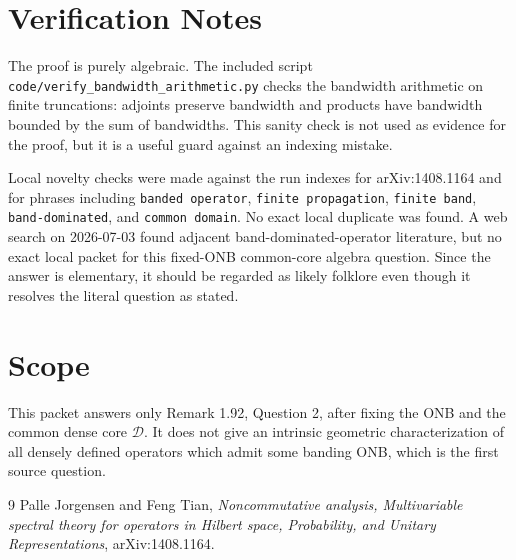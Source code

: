 \documentclass[11pt]{article}
\newcommand{\cD}{\mathcal D}
\begin{document}
\section*{Verification Notes}

The proof is purely algebraic.  The included script
\texttt{code/verify\_bandwidth\_arithmetic.py} checks the bandwidth arithmetic
on finite truncations: adjoints preserve bandwidth and products have bandwidth
bounded by the sum of bandwidths.  This sanity check is not used as evidence
for the proof, but it is a useful guard against an indexing mistake.

Local novelty checks were made against the run indexes for arXiv:1408.1164 and
for phrases including \texttt{banded operator}, \texttt{finite propagation},
\texttt{finite band}, \texttt{band-dominated}, and \texttt{common domain}.  No
exact local duplicate was found.  A web search on 2026-07-03 found adjacent
band-dominated-operator literature, but no exact local packet for this
fixed-ONB common-core algebra question.  Since the answer is elementary, it
should be regarded as likely folklore even though it resolves the literal
question as stated.

\section*{Scope}

This packet answers only Remark 1.92, Question 2, after fixing the ONB and the
common dense core $\cD$.  It does not give an intrinsic geometric
characterization of all densely defined operators which admit some banding ONB,
which is the first source question.

\begin{thebibliography}{9}
Palle Jorgensen and Feng Tian,
\emph{Noncommutative analysis, Multivariable spectral theory for operators in
Hilbert space, Probability, and Unitary Representations},
arXiv:1408.1164.
\end{thebibliography}
\end{document}
